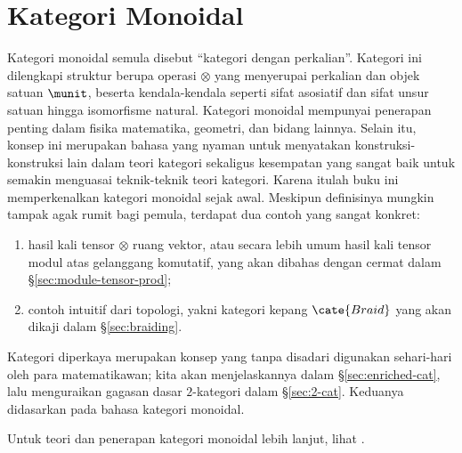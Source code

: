 
\chapter{Kategori Monoidal}\label{sec:monoidal-cat}
Kategori monoidal semula disebut ``kategori dengan perkalian''. Kategori ini dilengkapi struktur berupa operasi $\otimes$ yang menyerupai perkalian dan objek satuan $\munit$, beserta kendala-kendala seperti sifat asosiatif dan sifat unsur satuan hingga isomorfisme natural. Kategori monoidal mempunyai penerapan penting dalam fisika matematika, geometri, dan bidang lainnya. Selain itu, konsep ini merupakan bahasa yang nyaman untuk menyatakan konstruksi-konstruksi lain dalam teori kategori sekaligus kesempatan yang sangat baik untuk semakin menguasai teknik-teknik teori kategori. Karena itulah buku ini memperkenalkan kategori monoidal sejak awal. Meskipun definisinya mungkin tampak agak rumit bagi pemula, terdapat dua contoh yang sangat konkret:
\begin{enumerate}
	\item hasil kali tensor $\otimes$ ruang vektor, atau secara lebih umum hasil kali tensor modul atas gelanggang komutatif, yang akan dibahas dengan cermat dalam \S\ref{sec:module-tensor-prod};
	\item contoh intuitif dari topologi, yakni kategori kepang $\cate{Braid}$ yang akan dikaji dalam \S\ref{sec:braiding}.
\end{enumerate}

Kategori diperkaya merupakan konsep yang tanpa disadari digunakan sehari-hari oleh para matematikawan; kita akan menjelaskannya dalam \S\ref{sec:enriched-cat}, lalu menguraikan gagasan dasar $2$-kategori dalam \S\ref{sec:2-cat}. Keduanya didasarkan pada bahasa kategori monoidal.

Untuk teori dan penerapan kategori monoidal lebih lanjut, lihat \cite{EGNO15}.

